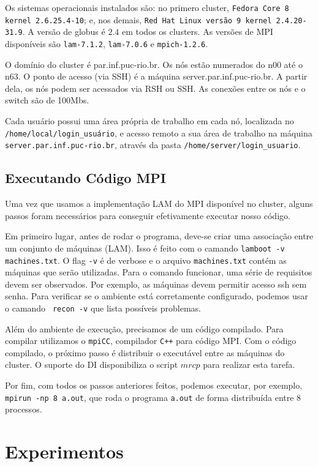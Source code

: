 \documentclass[12pt]{article}
\begin{document}
Os sistemas operacionais instalados são: no primero cluster,
\verb|Fedora Core 8 kernel 2.6.25.4-10|; e, nos demais,
\verb|Red Hat Linux versão 9 kernel 2.4.20-31.9|.
A versão de globus é $2.4$ em todos os clusters.
As versões de MPI disponíveis são \verb|lam-7.1.2|, \verb|lam-7.0.6| e \verb|mpich-1.2.6|. 

O domínio do cluster é par.inf.puc-rio.br.
Os nós estão numerados do n00 até o n63.
O ponto de acesso (via SSH) é a máquina server.par.inf.puc-rio.br.
A partir dela, os nós podem ser acessados via RSH ou SSH. As conexões entre os nós e o switch são de 100Mbs.

Cada usuário possui uma área própria de trabalho em cada nó,
localizada no \verb|/home/local/login_usuário|, 
e acesso remoto a sua área de trabalho na máquina \verb|server.par.inf.puc-rio.br|,
através da pasta \verb|/home/server/login_usuario|.

\subsection{Executando Código MPI}

Uma vez que usamos a implementação LAM do MPI disponível no cluster,
alguns passos foram necessários para conseguir efetivamente executar nosso
código.

Em primeiro lugar, antes de rodar o programa, deve-se criar uma associação
entre um conjunto de máquinas (LAM). Isso é feito com o camando \verb|lamboot -v machines.txt|.
O flag \verb|-v| é de verbose e o arquivo \verb|machines.txt| contém as máquinas que serão
utilizadas. Para o comando funcionar, uma série de requisitos devem ser observados.
Por exemplo, as máquinas devem permitir acesso ssh sem senha. Para
verificar se o ambiente está corretamente configurado, podemos usar o camando \verb| recon -v|
que lista possíveis problemas.

Além do ambiente de execução, precisamos de um código compilado. Para compilar
utilizamos o \verb|mpiCC|, compilador \verb|C++| para código MPI.
Com o código compilado, o próximo passo é distribuir o executável entre as máquinas do cluster.
O suporte do DI disponibiliza o script $mrcp$ para realizar esta tarefa.

Por fim, com todos os passos anteriores feitos, podemos
executar, por exemplo, \verb|mpirun -np 8 a.out|, que roda o programa \verb|a.out|
de forma distribuída entre $8$ processos.


\section{Experimentos}
\end{document}
